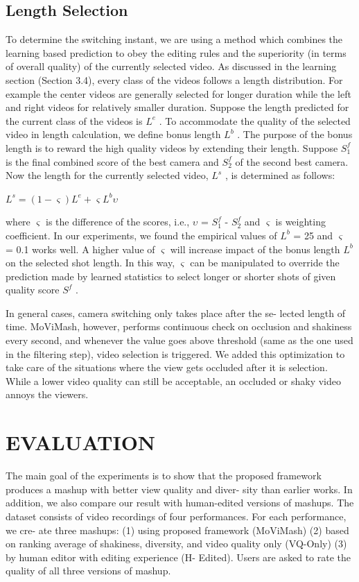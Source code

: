 \documentclass{sig-alternate-05-2015}
\begin{document}
\subsection{Length Selection}
To determine the switching instant, we are using a method which
combines the learning based prediction to obey the editing rules and
the superiority (in terms of overall quality) of the currently selected
video. As discussed in the learning section (Section 3.4), every
class of the videos follows a length distribution. For example the
center videos are generally selected for longer duration while the
left and right videos for relatively smaller duration.
Suppose the length predicted for the current class of the videos
is $L^e$ . To accommodate the quality of the selected video in length
calculation, we define bonus length $L^b$ . The purpose of the bonus
length is to reward the high quality videos by extending their length.
Suppose $S_1^f$ is the final combined score of the best camera and $S_2^f$
of the second best camera. Now the length for the currently selected
video, $L^s$ , is determined as follows:
\begin{center}
$L^s = (1 - \varsigma )L^e + \varsigma L^b \upsilon$
\end{center}
where $\varsigma$ is the difference of the scores, i.e., $\upsilon$ = $S_1^f$ - $S_2^f$
and  $\varsigma$ is
weighting coefficient. In our experiments, we found the empirical
values of $L^b$ = 25 and  $\varsigma$ = 0.1 works well. A higher value of
 $\varsigma$ will increase impact of the bonus length $L^b$ on the selected shot
length. In this way, $\varsigma$ can be manipulated to override the prediction
made by learned statistics to select longer or shorter shots of given
quality score $S^f$ .

In general cases, camera switching only takes place after the se-
lected length of time. MoViMash, however, performs continuous
check on occlusion and shakiness every second, and whenever the
value goes above threshold (same as the one used in the filtering
step), video selection is triggered. We added this optimization to
take care of the situations where the view gets occluded after it is
selection. While a lower video quality can still be acceptable, an
occluded or shaky video annoys the viewers.
\section{EVALUATION}
The main goal of the experiments is to show that the proposed
framework produces a mashup with better view quality and diver-
sity than earlier works. In addition, we also compare our result with
human-edited versions of mashups. The dataset consists of video
recordings of four performances. For each performance, we cre-
ate three mashups: (1) using proposed framework (MoViMash) (2)
based on ranking average of shakiness, diversity, and video quality only (VQ-Only) (3) by human editor with editing experience (H-
Edited). Users are asked to rate the quality of all three versions of
mashup.
\end{document}
